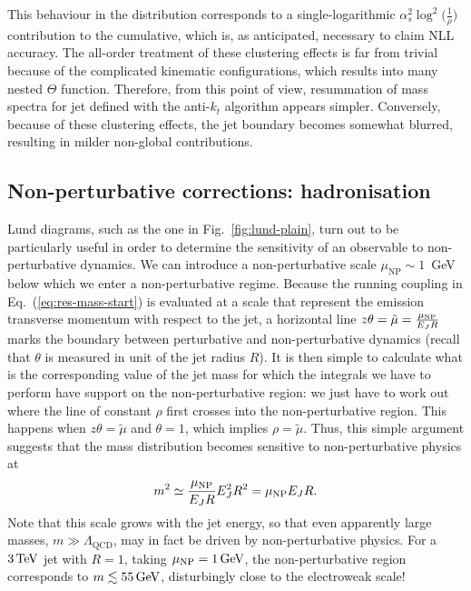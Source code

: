 This behaviour in the distribution corresponds to a single-logarithmic $\alpha_s^2 \log^2 \big(\frac{1}{\rho}\big)$ contribution to the cumulative, which is, as anticipated, necessary to claim NLL accuracy.
%
The all-order treatment of these clustering effects is far from trivial because of the complicated kinematic configurations, which results into many nested $\Theta$ function. Therefore, from this point of view, resummation of mass spectra for jet defined with the anti-$k_t$ algorithm appears simpler. Conversely, because of these clustering effects, the jet boundary becomes somewhat blurred, resulting in milder non-global contributions. 

\subsection{Non-perturbative corrections:
  hadronisation}\label{sec:plain-mass-hadronisation}

Lund diagrams, such as the one in Fig.~\ref{fig:lund-plain}, turn out
to be particularly useful in order to determine the sensitivity of an
observable to non-perturbative dynamics. We can introduce a
non-perturbative scale $\mu_\text{NP}\sim 1$~GeV below which we enter
a non-perturbative regime. Because the running coupling in
Eq.~(\ref{eq:res-mass-start}) is evaluated at a scale that represent
the emission transverse momentum with respect to the jet, a horizontal
line $z \theta =\tilde{\mu}=\frac{\mu_\text{NP}}{E_J R}$  marks the boundary between
perturbative and non-perturbative dynamics (recall that
$\theta$ is measured in unit of the jet radius $R$).
%
It is then simple to calculate what is the corresponding value of the jet mass for which the integrals we have to perform have support on the non-perturbative region: we just have to work out where the line of constant $\rho$ first crosses into the non-perturbative region. This happens when $z \theta= \tilde{\mu} $ and $\theta=1$, which implies $\rho=\tilde{\mu}$.
%
Thus, this simple argument suggests that the mass distribution becomes sensitive to non-perturbative physics at 
\begin{equation}\label{eq:mass-NP-estimate}
m^2\simeq \frac{\mu_\text{NP}}{E_J R} E_J^2 R^2= \mu_\text{NP} E_J R.
\end{equation}
%
%
Note that this scale grows with the jet energy, so that even apparently
large masses, $m \gg \Lambda_\text{QCD}$, may in fact be driven by
non-perturbative physics.
%
For a $3\,\mathrm{TeV}$ jet with $R=1$, taking $\mu_\text{NP} = 1\,\mathrm{GeV}$, the
non-perturbative region corresponds to $m \lesssim 55\,\mathrm{GeV}$,
disturbingly close to the electroweak scale!

